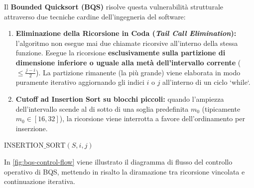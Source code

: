 Il \textbf{Bounded Quicksort (BQS)} risolve questa vulnerabilità strutturale attraverso due tecniche cardine dell'ingegneria del software:
\begin{enumerate}
  \item \textbf{Eliminazione della Ricorsione in Coda (\textit{Tail Call Elimination}):} l'algoritmo non esegue mai due chiamate ricorsive all'interno della stessa funzione. Esegue la ricorsione \textbf{esclusivamente sulla partizione di dimensione inferiore o uguale alla metà dell'intervallo corrente} ($\le \frac{j - i}{2}$). La partizione rimanente (la più grande) viene elaborata in modo puramente iterativo aggiornando gli indici $i$ o $j$ all'interno di un ciclo `while`.
  \item \textbf{Cutoff ad Insertion Sort su blocchi piccoli:} quando l'ampiezza dell'intervallo scende al di sotto di una soglia predefinita $m_0$ (tipicamente $m_0 \in [16, 32]$), la ricorsione viene interrotta a favore dell'ordinamento per inserzione.
\end{enumerate}

\begin{algorithm}[H]
\caption{Bounded Quicksort (BQS)}
\label{alg:bqs-algorithm}

$\text{INSERTION\_SORT}(S, i, j)$ 
\end{algorithm}

In \autoref{fig:bqs-control-flow} viene illustrato il diagramma di flusso del controllo operativo di BQS, mettendo in risalto la diramazione tra ricorsione vincolata e continuazione iterativa.

